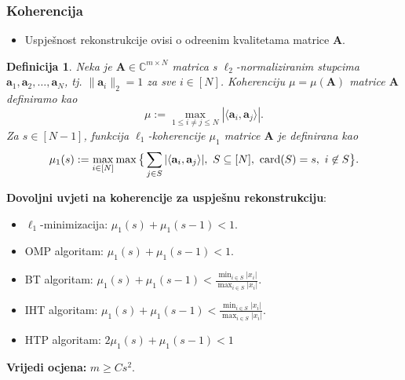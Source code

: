 \documentclass{beamer}
\newtheorem{defn}[thm]{Definicija}
\newcommand{\C}{\mathbb{C}}
\newcommand{\vect}[1]{\mathbf{#1}}
\renewcommand{\vec}{\vect}
\newcommand{\card}{\text{\normalfont{card}}}
\newcommand{\norm}[1]{\|{#1}\|}
\begin{document}
\begin{frame}
    \frametitle{Koherencija}
    \begin{itemize}
        \item Uspje\v{s}nost rekonstrukcije ovisi o odre\dj enim kvalitetama matrice $\vec A$.
    \end{itemize}
\begin{defn}
    Neka je $\vec A \in \C^{m \times N}$ matrica s $\ell_2$-normaliziranim stupcima $\vec a_1, \vec a_2, \dots, \vec a_N$, tj. $\norm{\vec a_i}_2 = 1$ za sve $i \in [N]$. Koherenciju $\mu = \mu(\vec A)$ matrice $\vec A$ definiramo kao
    \begin{equation*}
        \mu := \max_{1 \leq i \neq j \leq N} |\langle \vec a_i, \vec a_j \rangle| .
    \end{equation*}
    Za $s \in [N-1]$, funkcija $\ell_1$-koherencije $\mu_1$ matrice $\vec A$ je definirana kao
        \begin{equation*}
            \mu_1(s) := \max_{i \in [N]} \max \big\{ \sum_{j \in S} |\langle \vec a_i, \vec a_j \rangle|,\ S \subseteq [N],\ \card(S) = s,\ i \not \in S   \big\} .
        \end{equation*}

\end{defn}
\end{frame}

\begin{frame}
\textbf{Dovoljni uvjeti na koherencije za uspje\v{s}nu rekonstrukciju}:
        \medskip
\begin{itemize}
    \item $\ell_1$-minimizacija: $\mu_1(s) + \mu_1(s-1) < 1$.
        \medskip
    \item OMP algoritam: $\mu_1(s) + \mu_1(s-1) < 1$.
        \medskip
    \item BT algoritam: $\mu_1(s) + \mu_1(s-1) < \frac{\min_{i \in S}|x_i|}{\max_{i \in S}|x_i|}$.
        \medskip
    \item IHT algoritam: $\mu_1(s) + \mu_1(s-1) < \frac{\min_{i \in S}|x_i|}{\max_{i \in S}|x_i|}$.
        \medskip
    \item HTP algoritam: $2 \mu_1(s) + \mu_1(s-1) < 1$
\end{itemize}

        \bigskip
\textbf{Vrijedi ocjena: } $m \geq C s^2$.
\end{frame}
\end{document}

